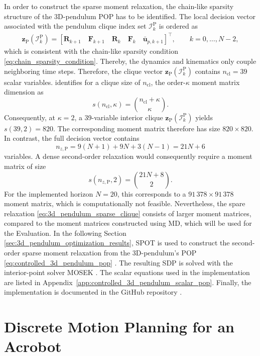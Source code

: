 In order to construct the sparse moment relaxation, the chain-like sparsity 
structure of the 3D-pendulum POP has to be identified. The local decision vector
associated with the pendulum clique index set \(\mathcal I_k^{\mathrm{P}}\) is ordered as
\begin{align}\label{eq:3d_pendulum_sparse_clique}
    \bm{z}_{\mathrm{P}}(\mathcal I_k^{\mathrm{P}})
    =
    [\bm{R}_{k+1} \quad \bm{F}_{k+1} \quad \bm{R}_{k} \quad \bm{F}_{k} \quad \bar{\bm{u}}_{p,k+1} ]^{\top},
    \qquad k=0,\ldots,N-2,
\end{align}
which is consistent with the chain-like sparsity condition \eqref{eq:chain_sparsity_condition}.
Thereby, the dynamics and kinematics only couple neighboring time steps. 
Therefore, the clique vector \(\bm{z}_{\mathrm{P}}(\mathcal I_k^{\mathrm{P}})\)
contains \(n_{\mathrm{cl}}=39\) scalar variables.
\cite{Sangli2025} identifies for a clique size of \(n_{\mathrm{cl}}\), the order-\(\kappa\) moment matrix
dimension as
\begin{equation}
s(n_{\mathrm{cl}},\kappa)
=\binom{n_{\mathrm{cl}}+\kappa}{\kappa}.
\label{eq:moment_size}
\end{equation}
Consequently, at $\kappa=2$, a 39-variable interior clique
\(\bm{z}_{\mathrm{P}}(\mathcal I_k^{\mathrm{P}})\) yields $s(39,2)=820$.
The corresponding moment matrix therefore has size $820\times820$. In
contrast, the full decision vector contains
\[
 n_{z,\mathrm{P}}=9(N+1)+9N+3(N-1)=21N+6
\]
variables. A dense second-order relaxation would consequently require a moment
matrix of size
\[
s(n_{z,\mathrm{P}},2)=\binom{21N+8}{2}.
\]
For the implemented horizon $N=20$, this corresponds to a
$91\,378\times91\,378$ moment matrix, which is computationally not feasible. 
Nevertheless, the spare relaxation \eqref{eq:3d_pendulum_sparse_clique} 
consists of larger moment matrices, compared to the moment matrices constructed using 
MD, which will be used for the Evaluation.
In the following Section \ref{sec:3d_pendulum_optimization_results},
SPOT is used to construct the second-order sparse moment relaxation from the 3D-pendulum's POP 
\eqref{eq:controlled_3d_pendulum_pop} \cite{Kang_2025Global}. The resulting SDP is solved with the interior-point solver
MOSEK \cite{MOSEK}. The scalar equations used in the implementation are listed in
Appendix~\ref{app:controlled_3d_pendulum_scalar_pop}. Finally, the implementation is documented 
in the GitHub repository \cite{Elshani2026CTO_GitHub}.

\section{Discrete Motion Planning for an Acrobot}
\label{sec:discrete_motion_planning_acrobot}

